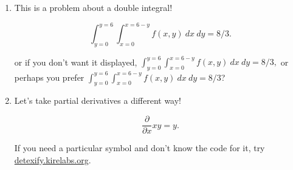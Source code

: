 \documentclass{article}
\begin{document}
\begin{enumerate}

\item This is a problem about a double integral!

$$\int_{y=0}^{y=6} \int_{x=0}^{x=6-y} f(x,y) \ dx \ dy = 8/3.$$

or if you don't want it displayed, $\int_{y=0}^{y=6} \int_{x=0}^{x=6-y} f(x,y) \ dx \ dy = 8/3,$ or perhaps you prefer $\displaystyle \int_{y=0}^{y=6} \int_{x=0}^{x=6-y} f(x,y) \ dx \ dy = 8/3$?

\item Let's take partial derivatives a different way! 

$$\frac{\partial}{\partial x} xy = y.$$

If you need a particular symbol and don't know the code for it, try \url{detexify.kirelabs.org}.

\end{enumerate}

\end{document}
